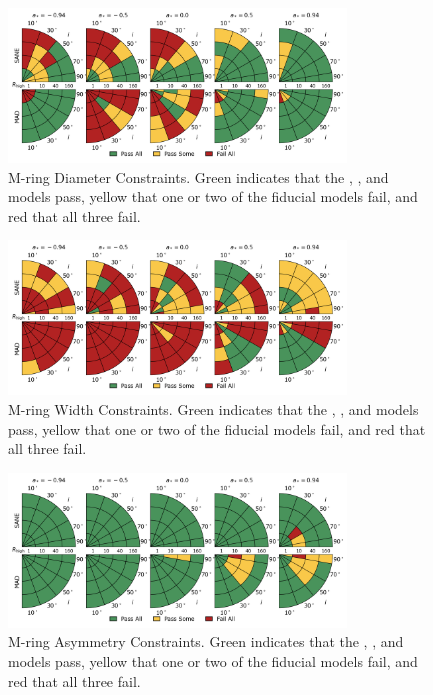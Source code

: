 \begin{figure}
  \centering
  \includegraphics[width=0.8\textwidth]{./figures/Mring_d_Constraints.png}
  \caption{M-ring Diameter Constraints.  Green indicates that the \kharma, \bhac, and \hamr models pass, yellow that one or two of the fiducial models fail, and red that all three fail.}
  \label{fig:mring_diam_pizza}
\end{figure}

\begin{figure}
  \centering
  \includegraphics[width=0.8\textwidth]{./figures/Mring_w_Constraints.png}
  \caption{M-ring Width Constraints.  Green indicates that the \kharma, \bhac, and \hamr models pass, yellow that one or two of the fiducial models fail, and red that all three fail.}
  \label{fig:mring_width_pizza}
\end{figure}

\begin{figure}
  \centering
  \includegraphics[width=0.8\textwidth]{./figures/Mring_f1_Constraints.png}
  \caption{M-ring Asymmetry Constraints.  Green indicates that the \kharma, \bhac, and \hamr models pass, yellow that one or two of the fiducial models fail, and red that all three fail.}
  \label{fig:mring_asymm_pizza}
\end{figure}


